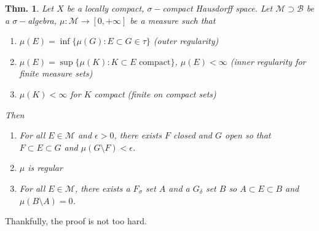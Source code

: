 \documentclass[12pt, a4paper]{book}
\newtheorem{theorem}{Thm.}[section]
\theoremstyle{nonumberplain}
\begin{document}
\begin{theorem}
    Let $X$ be a locally compact, $\sigma-$compact Hausdorff space.
    Let $\mathcal{M}\supset\mathcal{B}$ be a $\sigma-$algebra, $\mu:\mathcal{M}\to[0,+\infty]$ be a measure such that
    \begin{enumerate}[nolistsep,label=(\roman*)]
        \item $\mu(E)=\inf\{\mu(G):E\subset G\in\tau\}$ (outer regularity)
        \item $\mu(E)=\sup\{\mu(K):K\subset E\text{ compact}\}$, $\mu(E)<\infty$ (inner regularity for finite measure sets)
        \item $\mu(K)<\infty$ for $K$ compact (finite on compact sets)
    \end{enumerate}
    Then
    \begin{enumerate}[nolistsep]
        \item For all $E\in\mathcal{M}$ and $\epsilon>0$, there exists $F$ closed and $G$ open so that $F\subset E\subset G$ and $\mu(G\setminus F)<\epsilon$.
        \item $\mu$ is regular
        \item For all $E\in\mathcal{M}$, there exists a $F_\sigma$ set $A$ and a $G_\delta$ set $B$ so $A\subset E\subset B$ and $\mu(B\setminus A)=0$.
    \end{enumerate}
\end{theorem}
Thankfully, the proof is not too hard.
\end{document}
